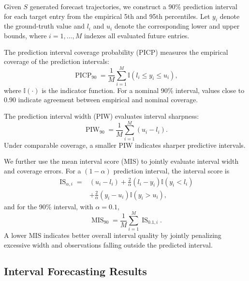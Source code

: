 \documentclass[sigconf, anonymous, review]{acmart}
\begin{document}
Given $S$ generated forecast trajectories, we construct a 90\%
prediction interval for each target entry from the empirical 5th and
95th percentiles. Let $y_i$ denote the ground-truth value and
$l_i$ and $u_i$ denote the corresponding lower and upper bounds,
where $i=1,\ldots,M$ indexes all evaluated future entries.

The prediction interval coverage probability (PICP) measures the
empirical coverage of the prediction intervals:
\begin{equation}
\operatorname{PICP}_{90}
=
\frac{1}{M}
\sum_{i=1}^{M}
\mathbb{I}
\left(
l_i \leq y_i \leq u_i
\right),
\label{eq:picp90}
\end{equation}
where $\mathbb{I}(\cdot)$ is the indicator function. For a nominal
90\% interval, values close to $0.90$ indicate agreement between
empirical and nominal coverage.

The prediction interval width (PIW) evaluates interval sharpness:
\begin{equation}
\operatorname{PIW}_{90}
=
\frac{1}{M}
\sum_{i=1}^{M}
(u_i-l_i).
\label{eq:piw90}
\end{equation}
Under comparable coverage, a smaller PIW indicates sharper predictive
intervals.

We further use the mean interval score (MIS) to jointly evaluate
interval width and coverage errors. For a $(1-\alpha)$ prediction
interval, the interval score is
\begin{equation}
\begin{aligned}
\operatorname{IS}_{\alpha,i}
={}&
(u_i-l_i)
+
\frac{2}{\alpha}(l_i-y_i)
\mathbb{I}(y_i<l_i)
\\
&+
\frac{2}{\alpha}(y_i-u_i)
\mathbb{I}(y_i>u_i),
\end{aligned}
\label{eq:interval_score}
\end{equation}
and for the 90\% interval, with $\alpha=0.1$,
\begin{equation}
\operatorname{MIS}_{90}
=
\frac{1}{M}
\sum_{i=1}^{M}
\operatorname{IS}_{0.1,i}.
\label{eq:mis90}
\end{equation}
A lower MIS indicates better overall interval quality by jointly
penalizing excessive width and observations falling outside the
predicted interval.

\subsection{Interval Forecasting Results}
\label{app:interval_results}
\end{document}
